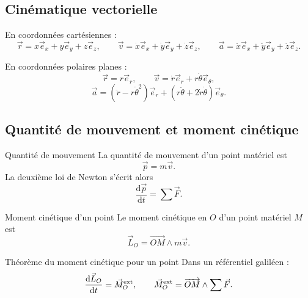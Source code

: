 \documentclass[11pt,a4paper]{article}
\newcommand{\vect}[1]{\overrightarrow{#1}}
\newcommand{\der}[2]{\frac{\mathrm{d}#1}{\mathrm{d}#2}}
\begin{document}
\subsection{Cinématique vectorielle}

En coordonnées cartésiennes :
\[
\vec r=x\vec e_x+y\vec e_y+z\vec e_z,
\qquad
\vec v=\dot x\vec e_x+\dot y\vec e_y+\dot z\vec e_z,
\qquad
\vec a=\ddot x\vec e_x+\ddot y\vec e_y+\ddot z\vec e_z.
\]

En coordonnées polaires planes :
\[
\vec r=r\vec e_r,
\qquad
\vec v=\dot r\vec e_r+r\dot\theta\vec e_\theta,
\]
\[
\vec a=(\ddot r-r\dot\theta^2)\vec e_r+(r\ddot\theta+2\dot r\dot\theta)\vec e_\theta.
\]

\begin{center}
\end{center}

\subsection{Quantité de mouvement et moment cinétique}

\begin{definitionbox}{Quantité de mouvement}{}
La quantité de mouvement d'un point matériel est
\[
\vec p=m\vec v.
\]
La deuxième loi de Newton s'écrit alors
\[
\der{\vec p}{t}=\sum \vec F.
\]
\end{definitionbox}

\begin{definitionbox}{Moment cinétique d'un point}{}
Le moment cinétique en $O$ d'un point matériel $M$ est
\[
\vec L_O=\vect{OM}\wedge m\vec v.
\]
\end{definitionbox}

\begin{propositionbox}{Théorème du moment cinétique pour un point}{}
Dans un référentiel galiléen :
\[
\der{\vec L_O}{t}=\vec M_O^{\rm ext},
\qquad
\vec M_O^{\rm ext}=\vect{OM}\wedge \sum \vec F.
\]
\end{propositionbox}
\end{document}
